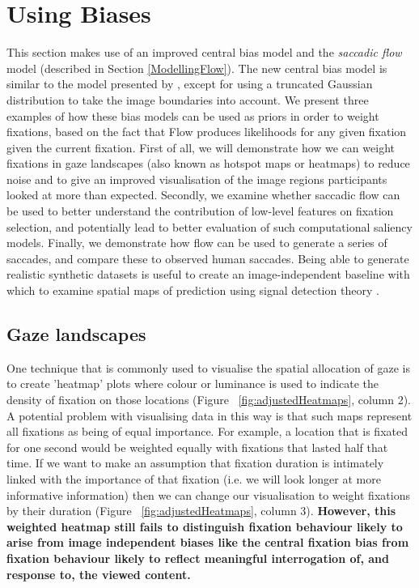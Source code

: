 
\section{Using Biases}
\label{sec:usingbiases}

This section makes use of an improved central bias model and the \textit{saccadic flow} model (described in Section \ref{ModellingFlow}). The new central bias model is similar to the model presented by \cite{clarke-tatler2014}, except for using a truncated Gaussian distribution to take the image boundaries into account. We present three examples of how these bias models can be used as priors in order to weight fixations, based on the fact that Flow produces likelihoods for any given fixation given the current fixation. First of all, we will demonstrate how we can weight fixations in gaze landscapes (also known as hotspot maps or heatmaps) to reduce noise and to give an improved visualisation of the image regions participants looked at more than expected. Secondly, we examine whether saccadic flow can be used to better understand the contribution of low-level features on fixation selection, and potentially lead to better evaluation of such computational saliency models. Finally, we demonstrate how flow can be used to generate a series of saccades, and compare these to observed human saccades. Being able to generate realistic synthetic datasets is useful to create an image-independent baseline with which to examine spatial maps of prediction using signal detection theory \citep[see][]{clarke-tatler2014}.

\subsection{Gaze landscapes}

One technique that is commonly used to visualise the spatial allocation of gaze is to create 'heatmap' plots where colour or luminance is used to indicate the density of fixation on those locations (Figure ~\ref{fig:adjustedHeatmaps}, column 2). A potential problem with visualising data in this way is that such maps represent all fixations as being of equal importance. For example, a location that is fixated for one second would be weighted equally with fixations that lasted half that time. If we want to make an assumption that fixation duration is intimately linked with the importance of that fixation (i.e. we will look longer at more informative information) then we can change our visualisation to weight fixations by their duration (Figure ~\ref{fig:adjustedHeatmaps}, column 3). \textbf{However, this weighted heatmap still fails to distinguish fixation behaviour likely to arise from image independent biases like the central fixation bias from fixation behaviour likely to reflect meaningful interrogation of, and response to, the viewed content.} 

